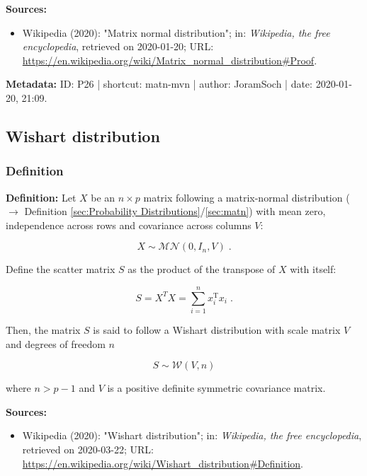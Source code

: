 \documentclass[a4paper,12pt,twoside]{book}
\begin{document}
\vspace{1em}
\textbf{Sources:}
\begin{itemize}
\item Wikipedia (2020): "Matrix normal distribution"; in: \textit{Wikipedia, the free encyclopedia}, retrieved on 2020-01-20; URL: \url{https://en.wikipedia.org/wiki/Matrix_normal_distribution#Proof}.
\end{itemize}


\vspace{1em}
\textbf{Metadata:} ID: P26 | shortcut: matn-mvn | author: JoramSoch | date: 2020-01-20, 21:09.
\vspace{1em}



\subsection{Wishart distribution}

\subsubsection[\textit{Definition}]{Definition} \label{sec:wish}
\setcounter{equation}{0}

\textbf{Definition:} Let $X$ be an $n \times p$ matrix following a matrix-normal distribution ($\rightarrow$ Definition \ref{sec:Probability Distributions}/\ref{sec:matn}) with mean zero, independence across rows and covariance across columns $V$:

\begin{equation} \label{eq:wish-matn}
X \sim \mathcal{MN}(0, I_n, V) \; .
\end{equation}

Define the scatter matrix $S$ as the product of the transpose of $X$ with itself:

\begin{equation} \label{eq:wish-scat-mat}
S = X^T X = \sum_{i=1}^n x_i^\mathrm{T} x_i \; .
\end{equation}

Then, the matrix $S$ is said to follow a Wishart distribution with scale matrix $V$ and degrees of freedom $n$

\begin{equation} \label{eq:wish-wish}
S \sim \mathcal{W}(V, n)
\end{equation}

where $n > p - 1$ and $V$ is a positive definite symmetric covariance matrix.


\vspace{1em}
\textbf{Sources:}
\begin{itemize}
\item Wikipedia (2020): "Wishart distribution"; in: \textit{Wikipedia, the free encyclopedia}, retrieved on 2020-03-22; URL: \url{https://en.wikipedia.org/wiki/Wishart_distribution#Definition}.
\end{itemize}
\end{document}
